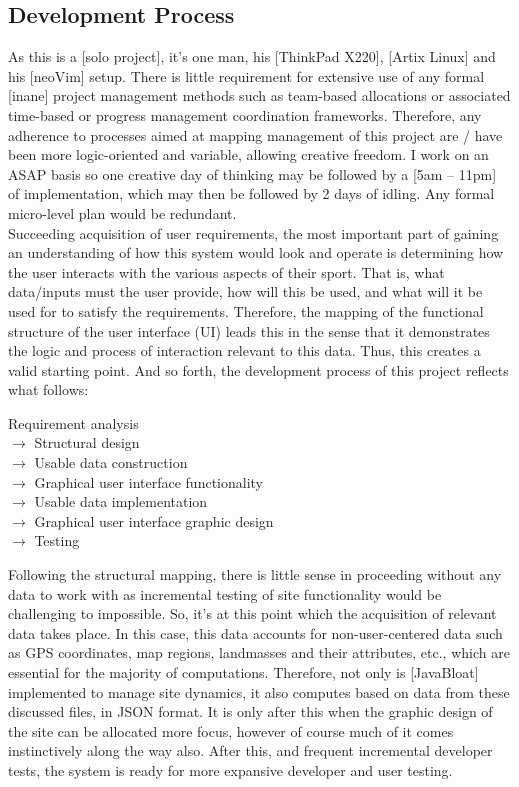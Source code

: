 \documentclass[11pt, english]{article}
\begin{document}
	\subsection{Development Process}

	As this is a [solo project], it's one man, his [ThinkPad X220], [Artix Linux] and his [neoVim] setup. There is little requirement for extensive use of any formal [inane] project management methods such as team-based allocations or associated time-based or progress management coordination frameworks. Therefore, any adherence to processes aimed at mapping management of this project are / have been more logic-oriented and variable, allowing creative freedom. I work on an ASAP basis so one creative day of thinking may be followed by a [5am -- 11pm] of implementation, which may then be followed by 2 days of idling. Any formal micro-level plan would be redundant.\\

	Succeeding acquisition of user requirements, the most important part of gaining an understanding of how this system would look and operate is determining how the user interacts with the various aspects of their sport. That is, what data/inputs must the user provide, how will this be used, and what will it be used for to satisfy the requirements. Therefore, the mapping of the functional structure of the user interface (UI) leads this in the sense that it demonstrates the logic and process of interaction relevant to this data. Thus, this creates a valid starting point. And so forth, the development process of this project reflects what follows:

	\begin{center}
		Requirement analysis\\
		$\rightarrow$ Structural design\\
		$\rightarrow$ Usable data construction\\
		$\rightarrow$ Graphical user interface functionality\\
		$\rightarrow$ Usable data implementation\\
		$\rightarrow$ Graphical user interface graphic design\\
		$\rightarrow$ Testing
	\end{center}

	Following the structural mapping, there is little sense in proceeding without any data to work with as incremental testing of site functionality would be challenging to impossible. So, it's at this point which the acquisition of relevant data takes place. In this case, this data accounts for non-user-centered data such as GPS coordinates, map regions, landmasses and their attributes, etc., which are essential for the majority of computations. Therefore, not only is [JavaBloat] implemented to manage site dynamics, it also computes based on data from these discussed files, in JSON format. It is only after this when the graphic design of the site can be allocated more focus, however of course much of it comes instinctively along the way also. After this, and frequent incremental developer tests, the system is ready for more expansive developer and user testing.\\
\end{document}
